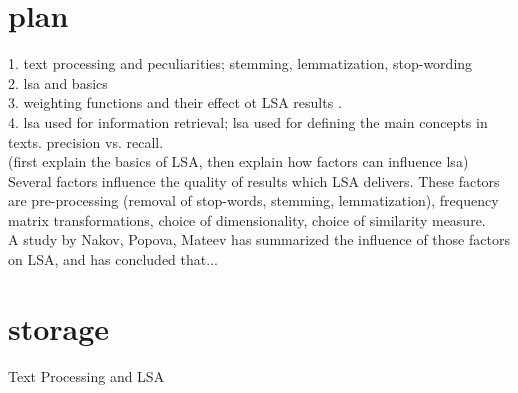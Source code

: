 \section{plan}
\label{sec:lsa:plan}
1. text processing and peculiarities; stemming, lemmatization, stop-wording\\
2. lsa and basics\\
3. weighting functions and their effect ot LSA results \cite{Nakov_weightfunctions}. \\
4. lsa used for information retrieval; lsa used for defining the main concepts in texts. precision vs. recall. \\
(first explain the basics of LSA, then explain how factors can influence lsa)\\
Several factors influence the quality of results which LSA delivers. These factors are pre-processing (removal of stop-words, stemming, lemmatization), frequency matrix transformations, choice of dimensionality, choice of similarity measure.\\
A study by Nakov, Popova, Mateev\cite{Nakov_weightfunctions} has summarized the influence of those factors on LSA, and has concluded that...\\

\section{storage}
Text Processing and LSA\\

